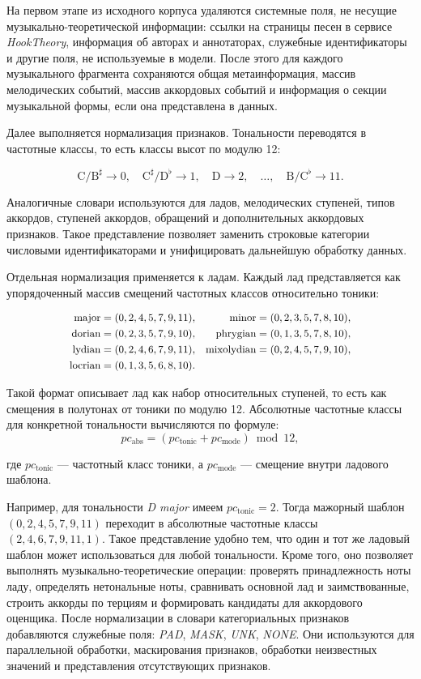 \documentclass[a4paper,12pt]{extarticle}
\begin{document}
На первом этапе из исходного корпуса удаляются системные поля, не несущие музыкально-теоретической информации: ссылки на страницы песен в сервисе \textit{HookTheory}, информация об авторах и аннотаторах, служебные идентификаторы и другие поля, не используемые в модели. После этого для каждого музыкального фрагмента сохраняются общая метаинформация, массив мелодических событий, массив аккордовых событий и информация о секции музыкальной формы, если она представлена в данных.

Далее выполняется нормализация признаков. Тональности переводятся в частотные классы, то есть классы высот по модулю 12:

\[
\mathrm{C}/\mathrm{B}^{\sharp}\to 0,\quad
\mathrm{C}^{\sharp}/\mathrm{D}^{\flat}\to 1,\quad
\mathrm{D}\to 2,\quad \ldots,\quad
\mathrm{B}/\mathrm{C}^{\flat}\to 11.
\]

Аналогичные словари используются для ладов, мелодических ступеней, типов аккордов, ступеней аккордов, обращений и дополнительных аккордовых признаков. Такое представление позволяет заменить строковые категории числовыми идентификаторами и унифицировать дальнейшую обработку данных.

Отдельная нормализация применяется к ладам. Каждый лад представляется как упорядоченный массив смещений частотных классов относительно тоники:

\[
\small
\begin{alignedat}{2}
\mathrm{major} &= (0,2,4,5,7,9,11),\quad & \mathrm{minor} &= (0,2,3,5,7,8,10),\\
\mathrm{dorian} &= (0,2,3,5,7,9,10),\quad & \mathrm{phrygian} &= (0,1,3,5,7,8,10),\\
\mathrm{lydian} &= (0,2,4,6,7,9,11),\quad & \mathrm{mixolydian} &= (0,2,4,5,7,9,10),\\
\mathrm{locrian} &= (0,1,3,5,6,8,10). &
\end{alignedat}
\]

Такой формат описывает лад как набор относительных ступеней, то есть как смещения в полутонах от тоники по модулю 12. Абсолютные частотные классы для конкретной тональности вычисляются по формуле:
\[
pc_{\mathrm{abs}}=(pc_{\mathrm{tonic}}+pc_{\mathrm{mode}})\bmod 12,
\]

где $pc_{\mathrm{tonic}}$ --- частотный класс тоники, а $pc_{\mathrm{mode}}$ --- смещение внутри ладового шаблона.

Например, для тональности \textit{D major} имеем $pc_{\mathrm{tonic}}=2$. Тогда мажорный шаблон $(0,2,4,5,7,9,11)$ переходит в абсолютные частотные классы $(2,4,6,7,9,11,1)$.
Такое представление удобно тем, что один и тот же ладовый шаблон может использоваться для любой тональности. Кроме того, оно позволяет выполнять музыкально-теоретические операции: проверять принадлежность ноты ладу, определять нетональные ноты, сравнивать основной лад и заимствованные, строить аккорды по терциям и формировать кандидаты для аккордового оценщика.
После нормализации в словари категориальных признаков добавляются служебные поля: \textit{PAD}, \textit{MASK}, \textit{UNK}, \textit{NONE}. Они используются для параллельной обработки, маскирования признаков, обработки неизвестных значений и представления отсутствующих признаков.
\end{document}
